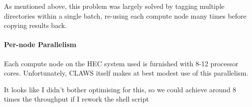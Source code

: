 As mentioned above, this problem was largely solved by tagging multiple directories within a single batch, re-using each compute node many times before copying results back.

\paragraph{Per-node Parallelism}
Each compute node on the HEC system used is furnished with 8-12 processor cores.  Unfortunately, CLAWS itself makes at best modest use of this parallelism.

{\dr It looks like I didn't bother optimising for this, so we could achieve around 8 times the throughput if I rework the shell script}





